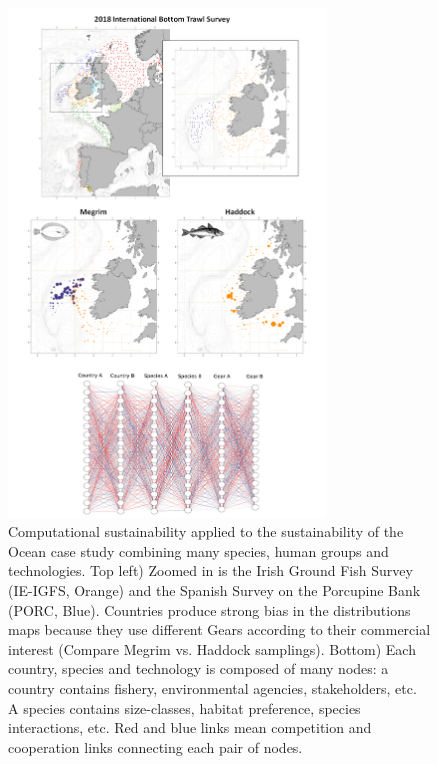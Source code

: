\documentclass[12pt,a4paper]{article}
\begin{document}
\begin{figure}[H]
	 \centering
	 \includegraphics[width = 0.75\textwidth]{casestudy.pdf}
	 \caption{Computational sustainability applied to the sustainability of the Ocean case study combining many species, human groups and technologies. Top left) Zoomed in is the Irish Ground Fish Survey (IE-IGFS, Orange) and the Spanish Survey on the Porcupine Bank (PORC, Blue). Countries produce strong bias in the distributions maps because they use different Gears according to their commercial interest (Compare Megrim vs. Haddock samplings). Bottom) Each country, species and technology is composed of many nodes: a country contains fishery, environmental agencies, stakeholders, etc. A species contains size-classes, habitat preference, species interactions, etc. Red and blue links mean competition and cooperation links connecting each pair of nodes.}
\end{figure}
\end{document}
